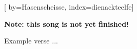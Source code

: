 
[%
    by={Hasenscheisse},
    index={dienackteelfe}]


    \label{dienackteelfe}

    \textbf{Note: this song is not yet finished!}

    \beginverse
        Example verse ...
    \endverse
\endsong
